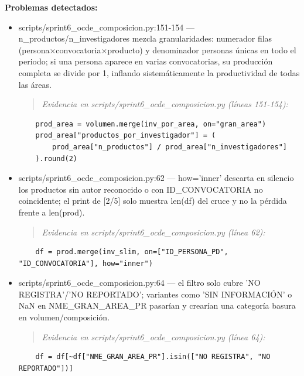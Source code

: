 \begin{tcolorbox}[riesgo]
\textbf{Problemas detectados:}
\begin{itemize}
  \item scripts/sprint6\_ocde\_composicion.py:151-154 --- n\_productos/n\_investigadores mezcla granularidades: numerador filas (persona$\times$convocatoria$\times$producto) y denominador personas únicas en todo el periodo; si una persona aparece en varias convocatorias, su producción completa se divide por 1, inflando sistemáticamente la productividad de todas las áreas.
\begin{quote}\footnotesize\ttfamily
\noindent\emph{Evidencia en scripts/sprint6\_ocde\_composicion.py (líneas 151-154):}
\end{quote}
\begin{lstlisting}
    prod_area = volumen.merge(inv_por_area, on="gran_area")
    prod_area["productos_por_investigador"] = (
        prod_area["n_productos"] / prod_area["n_investigadores"]
    ).round(2)
\end{lstlisting}

  \item scripts/sprint6\_ocde\_composicion.py:62 --- how='inner' descarta en silencio los productos sin autor reconocido o con ID\_CONVOCATORIA no coincidente; el print de [2/5] solo muestra len(df) del cruce y no la pérdida frente a len(prod).
\begin{quote}\footnotesize\ttfamily
\noindent\emph{Evidencia en scripts/sprint6\_ocde\_composicion.py (línea 62):}
\end{quote}
\begin{lstlisting}
    df = prod.merge(inv_slim, on=["ID_PERSONA_PD", "ID_CONVOCATORIA"], how="inner")
\end{lstlisting}

  \item scripts/sprint6\_ocde\_composicion.py:64 --- el filtro solo cubre 'NO REGISTRA'/'NO REPORTADO'; variantes como 'SIN INFORMACIÓN' o NaN en NME\_GRAN\_AREA\_PR pasarían y crearían una categoría basura en volumen/composición.
\begin{quote}\footnotesize\ttfamily
\noindent\emph{Evidencia en scripts/sprint6\_ocde\_composicion.py (línea 64):}
\end{quote}
\begin{lstlisting}
    df = df[~df["NME_GRAN_AREA_PR"].isin(["NO REGISTRA", "NO REPORTADO"])]
\end{lstlisting}

\end{itemize}
\end{tcolorbox}

